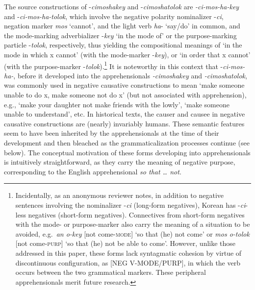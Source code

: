 \documentclass[output=paper,colorlinks,citecolor=brown]{langscibook}
\begin{document}
The source constructions of \nobreakdash-\textit{cimoshakey} and \nobreakdash-\textit{cimoshatolok} are \textit{-ci-mos-ha-key} and \nobreakdash-\textit{ci-mos-ha-tolok}, which involve the negative polarity nominalizer \nobreakdash-\textit{ci}, negation marker \textit{mos} `cannot', and the light verb \textit{ha}- `say/do' in common, and the mode-marking adverbializer \nobreakdash-\textit{key} `in the mode of' or the purpose-marking particle \nobreakdash-\textit{tolok}, respectively, thus yielding the compositional meanings of `in the mode in which x cannot' (with the mode-marker \nobreakdash-\textit{key}), or `in order that x cannot' (with the purpose-marker \nobreakdash-\textit{tolok}).\footnote{Incidentally, as an anonymous reviewer notes, in addition to negative sentences involving the nominalizer \nobreakdash-\textit{ci} (long-form negatives), Korean has \nobreakdash-\textit{ci}-less negatives (short-form negatives). Connectives from short-form negatives with the mode- or purpose-marker also carry the meaning of a situation to be avoided, e.g.\  \textit{an o-key} [not come-\textsc{mode}] `so that (he) not come' or \textit{mos o-tolok} [not come-\textsc{purp}] `so that (he) not be able to come'. However, unlike those addressed in this paper, these forms lack syntagmatic cohesion by virtue of discontinuous configuration, as [NEG V-MODE/PURP], in which the verb occurs between the two grammatical markers. These peripheral apprehensionals merit future research.} It is noteworthy in this context that  \nobreakdash-\textit{ci-mos-ha-}, before it developed into the apprehensionals \textit{-cimoshakey} and \textit{-cimoshatolok}, was commonly used in negative causative constructions to mean `make someone unable to do x, make someone not do x' (but not associated with apprehension), e.g., `make your daughter not make friends with the lowly', `make someone unable to understand', etc. In historical texts, the causer and causee in negative causative constructions are (nearly) invariably humans. These semantic features seem to have been inherited by the apprehensionals at the time of their development and then bleached as the grammaticalization processes continue (see  below). The conceptual motivation of these forms developing into apprehensionals is intuitively straightforward, as they carry the meaning of negative purpose, corresponding to the English apprehensional \textit{so that  … not}.
\end{document}
